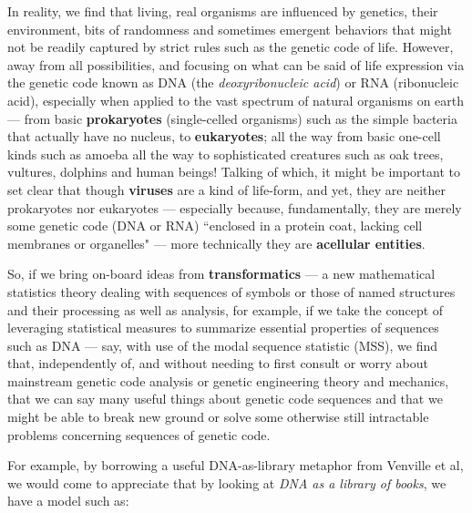\documentclass[a4paper, 18pt]{article} %
\begin{document}
In reality, we find that living, real organisms are influenced by genetics, their environment, bits of randomness and sometimes emergent behaviors that might not be readily captured by strict rules such as the genetic code of life. However, away from all possibilities, and focusing on what can be said of life expression via the genetic code known as DNA (the \textit{deoxyribonucleic acid}) or RNA (ribonucleic acid), especially when applied to the vast spectrum of natural organisms on earth --- from basic \textbf{prokaryotes} (single-celled organisms) such as the simple bacteria that actually have no nucleus\cite{bioexplorer2025}, to  \textbf{eukaryotes}; all the way from basic one-cell kinds such as amoeba\cite{kang2017deep} all the way to sophisticated creatures such as oak trees, vultures, dolphins and human beings! Talking of which, it might be important to set clear that though \textbf{viruses} are a kind of life-form\cite{libretexts2025viruses}, and yet, they are neither prokaryotes nor eukaryotes --- especially because, fundamentally, they are merely some genetic code (DNA or RNA) ``enclosed in a protein coat, lacking cell membranes or organelles"\cite{libretexts2025viruses} --- more technically they are \textbf{acellular entities}.

So, if we bring on-board ideas from \textbf{transformatics}\cite{transformatics} --- a new mathematical statistics theory dealing with sequences of symbols or those of named structures and their processing as well as analysis, for example, if we take the concept of leveraging statistical measures to summarize essential properties of sequences such as DNA --- say, with use of the modal sequence statistic (MSS), we find that, independently of, and without needing to first consult or worry about mainstream genetic code analysis or genetic engineering theory and mechanics, that we can say many useful things about genetic code sequences and that we might be able to break new ground or solve some otherwise still intractable problems concerning sequences of genetic code.




For example, by borrowing a useful DNA-as-library metaphor from Venville et al\cite{venville2006analogies}, we would come to appreciate that by looking at \textit{DNA as a library of books}, we have a model such as:
\end{document}
